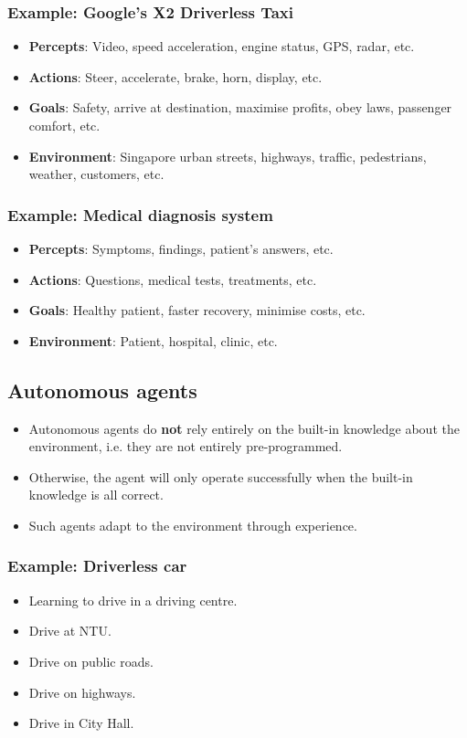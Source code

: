 \documentclass[11pt]{article}
\begin{document}
\subsubsection{Example: Google's X2 Driverless Taxi}
\label{sec:orgba38421}
\begin{itemize}
\item \textbf{Percepts}: Video, speed acceleration, engine status, GPS, radar, etc.
\item \textbf{Actions}: Steer, accelerate, brake, horn, display, etc.
\item \textbf{Goals}: Safety, arrive at destination, maximise profits, obey laws, passenger comfort, etc.
\item \textbf{Environment}: Singapore urban streets, highways, traffic, pedestrians, weather, customers, etc.
\end{itemize}
\subsubsection{Example: Medical diagnosis system}
\label{sec:org7e47f2f}
\begin{itemize}
\item \textbf{Percepts}: Symptoms, findings, patient's answers, etc.
\item \textbf{Actions}: Questions, medical tests, treatments, etc.
\item \textbf{Goals}: Healthy patient, faster recovery, minimise costs, etc.
\item \textbf{Environment}: Patient, hospital, clinic, etc.
\end{itemize}
\subsection{Autonomous agents}
\label{sec:orgf3f40d4}
\begin{itemize}
\item Autonomous agents do \textbf{not} rely entirely on the built-in knowledge about the environment, i.e. they are not entirely pre-programmed.
\item Otherwise, the agent will only operate successfully when the built-in knowledge is all correct.
\item Such agents adapt to the environment through experience.
\end{itemize}
\subsubsection{Example: Driverless car}
\label{sec:org8850e69}
\begin{itemize}
\item Learning to drive in a driving centre.
\item Drive at NTU.
\item Drive on public roads.
\item Drive on highways.
\item Drive in City Hall.
\end{itemize}
\end{document}
